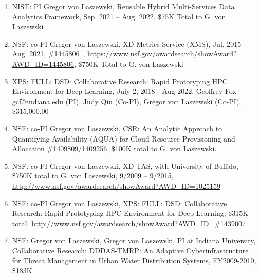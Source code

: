 \documentclass{article}
\begin{document}
\begin{enumerate}


\item NIST: PI Gregor von Laszewski, Reusable Hybrid Multi-Services Data Analytics Framework, Sep. 2021 – Aug. 2022, \$75K Total to G. von Laszewski
\item  NSF: co-PI Gregor von Laszewski, XD Metrics Service (XMS), Jul. 2015 – Aug. 2021, \#1445806 , \url{https://www.nsf.gov/awardsearch/showAward?AWD_ID=1445806}, \$750K Total to G. von Laszewski
\item  XPS: FULL: DSD: Collaborative Research: Rapid Prototyping HPC Environment for Deep Learning, July 2, 2018 - Aug 2022, Geoffrey Fox gcf@indiana.edu (PI), Judy Qiu (Co-PI), Gregor von Laszewski (Co-PI), 	\$315,000.00
\item  NSF: co-PI Gregor von Laszewski, CSR: An Analytic Approach to Quantifying Availability (AQUA) for Cloud Resource Provisioning and Allocation \#1409809/1409256, \$100K total to G. von Laszewski. 

\item  NSF: co-PI Gregor von Laszewski, XD TAS, with University of Buffalo, \$750K total to G. von Laszewski, 9/2009 – 9/2015, \url{http://www.nsf.gov/awardsearch/showAward?AWD_ID=1025159}

\item  NSF: co-PI Gregor von Laszewski, XPS: FULL: DSD: Collaborative Research: Rapid Prototyping HPC Environment for Deep Learning, \$315K total.
  \url{http://www.nsf.gov/awardsearch/showAward?AWD_ID=\#1439007}

\item  NSF: Gregor von Laszewski, Gregor von Laszewski, PI at Indiana University, Collaborative Research: DDDAS-TMRP: An Adaptive Cyberinfrastructure for Threat Management in Urban Water Distribution Systems, FY2009-2010, \$183K
  

\end{enumerate}
\end{document}
